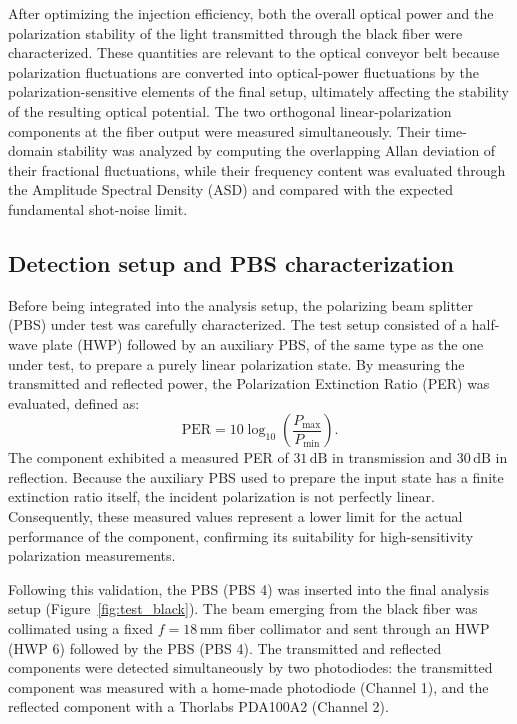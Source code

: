 After optimizing the injection efficiency, both the overall optical power and the polarization stability of the light transmitted through the black fiber were characterized. These quantities are relevant to the optical conveyor belt because polarization fluctuations are converted into optical-power fluctuations by the polarization-sensitive elements of the final setup, ultimately affecting the stability of the resulting optical potential. The two orthogonal linear-polarization components at the fiber output were measured simultaneously. Their time-domain stability was analyzed by computing the overlapping Allan deviation of their fractional fluctuations, while their frequency content was evaluated through the Amplitude Spectral Density (ASD) and compared with the expected fundamental shot-noise limit.

\subsection{Detection setup and PBS characterization}

Before being integrated into the analysis setup, the polarizing beam splitter (PBS) under test was carefully characterized. The test setup consisted of a half-wave plate (HWP) followed by an auxiliary PBS, of the same type as the one under test, to prepare a purely linear polarization state. By measuring the transmitted and reflected power, the Polarization Extinction Ratio (PER) was evaluated, defined as:
\begin{equation}
    \mathrm{PER}
    =
    10\log_{10}
    \left(
        \frac{P_{\mathrm{max}}}{P_{\mathrm{min}}}
    \right).
\end{equation}
The component exhibited a measured PER of $31\,\mathrm{dB}$ in transmission and $30\,\mathrm{dB}$ in reflection. Because the auxiliary PBS used to prepare the input state has a finite extinction ratio itself, the incident polarization is not perfectly linear. Consequently, these measured values represent a lower limit for the actual performance of the component, confirming its suitability for high-sensitivity polarization measurements.

Following this validation, the PBS (PBS 4) was inserted into the final analysis setup (Figure~\ref{fig:test_black}). The beam emerging from the black fiber was collimated using a fixed $f=18\,\mathrm{mm}$ fiber collimator and sent through an HWP (HWP 6) followed by the PBS (PBS 4). The transmitted and reflected components were detected simultaneously by two photodiodes: the transmitted component was measured with a home-made photodiode (Channel 1), and the reflected component with a Thorlabs PDA100A2 (Channel 2).

